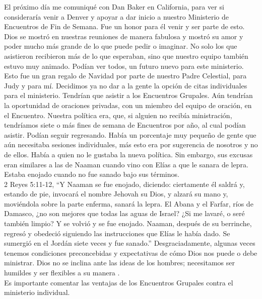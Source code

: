 \documentclass[twoside, 12pt]{book}
\begin{document}
El próximo día me comuniqué con Dan Baker en California, para ver si consideraría venir a Denver y apoyar a dar inicio a nuestro Ministerio de Encuentros de Fin de Semana. Fue un honor para él venir y ser parte de esto. Dios se mostró en nuestras reuniones de manera fabulosa y mostró su amor y poder mucho más grande de lo que puede pedir o imaginar. No solo los que asistieron recibieron más de lo que esperaban, sino que nuestro equipo también estuvo muy animado. Podían ver todos, un futuro nuevo para este ministerio. Esto fue un gran regalo de Navidad por parte de nuestro Padre Celestial, para Judy y para mí. Decidimos ya no dar a la gente la opción de citas individuales para el ministerio. Tendrían que asistir a los Encuentros Grupales. Aún tendrían la oportunidad de oraciones privadas, con un miembro del equipo de oración, en el Encuentro. Nuestra política era, que, si alguien no recibía ministración, tendríamos siete o más fines de semana de Encuentros por año, al cual podían asistir. Podían seguir regresando. Había un porcentaje muy pequeño de gente que aún necesitaba sesiones individuales, más esto era por sugerencia de nosotros y no de ellos. Había a quien no le gustaba la nueva política. Sin embargo, sus excusas eran similares a las de Naaman cuando vino con Elías a que le sanara de lepra. Estaba enojado cuando no fue sanado bajo sus términos.\\

2 Reyes 5:11-12, “Y Naaman se fue enojado, diciendo: ciertamente él saldrá y, estando de pie, invocará el nombre Jehovah su Dios, y alzará su mano y, moviéndola sobre la parte enferma, sanará la lepra. El Abana y el Farfar, ríos de Damasco, ¿no son mejores que todas las aguas de Israel? ¿Si me lavaré, o seré también limpio? Y se volvió y se fue enojado. Naaman, después de su berrinche, regresó y obedeció siguiendo las instrucciones que Elías le había dado. Se sumergió en el Jordán siete veces y fue sanado.” Desgraciadamente, algunas veces tenemos condiciones preconcebidas y expectativas de cómo Dios nos puede o debe ministrar. Dios no se inclina ante las ideas de los hombres; necesitamos ser humildes y ser flexibles a su manera .\\

Es importante comentar las ventajas de los Encuentros Grupales contra el ministerio individual.\\
\end{document}
